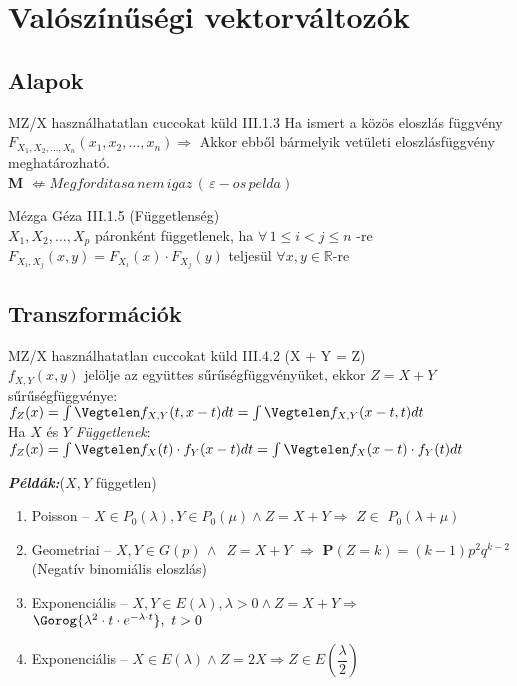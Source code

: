 \section{Valószínűségi vektorváltozók}

\subsection{Alapok}
  \begin{tetel}{MZ/X használhatatlan cuccokat küld}
	III.1.3 Ha ismert a közös eloszlás függvény $F_{X_1,X_2,\ldots,X_n}(x_1,x_2,\ldots,x_n) \Longrightarrow $ Akkor ebből bármelyik vetületi eloszlásfüggvény meghatározható. \\[3pt]
\small \textbf{M} $\nLeftarrow Megforditasa\, nem\, igaz\, (\, \varepsilon -os\, pelda)$
\normalsize \\[6pt]
\end{tetel}

  \begin{definicio}{Mézga Géza}
	III.1.5 (Függetlenség)\\[3pt]
	$X_1,X_2,\ldots,X_p$ páronként függetlenek, ha $\forall\, 1 \leq i < j \leq n$ -re $F_{X_i,X_j}(x,y) = F_{X_i}(x) \cdot F_{X_j}(y)$ teljesül $\forall x,y \in \mathbb{R} $-re
\end{definicio}

\subsection{Transzformációk}

  \begin{tetel}{MZ/X használhatatlan cuccokat küld}
	III.4.2 (X + Y = Z)\\[3pt]
	$f_{X,Y}(x,y)$ jelölje az együttes sűrűségfüggvényüket, ekkor $Z = X + Y$ sűrűségfüggvénye:\\[2pt]
\forceindent	$f_Z(x) = \int\Vegtelen f_{X,Y}(t,x-t) dt = \int\Vegtelen f_{X,Y}(x-t,t) dt$\\[2pt]
Ha $X$ és $Y$ \textit{Függetlenek}: \\[2pt]
\forceindent 	$f_Z(x) = \int\Vegtelen f_X(t) \cdot f_Y(x-t) dt = \int\Vegtelen f_X(x-t) \cdot f_Y(t) dt$\\[6pt]
\end{tetel}

\textbf{\textit{Példák:}}($X,Y$ független)
	\begin{enumerate}
 		\item Poisson --  $X \in P_0(\lambda), Y \in P_0(\mu) \land Z = X + Y \Longrightarrow$  $Z \in$ $P_0(\lambda + \mu)$
 		\item Geometriai -- $X,Y \in G(p)\, \land$\, $ Z = X + Y$  $\Longrightarrow$ $\textbf{P}(Z = k) = (k-1) p^2 q^{k-2}$ (Negatív binomiális eloszlás)
 		\item Exponenciális -- $X,Y \in E(\lambda), \lambda > 0 \land Z = X + Y \Longrightarrow$ $ \Gorog{\lambda^2 \cdot t \cdot e^{-\lambda \cdot t} },\,\, t > 0$ %
 		\item Exponenciális -- $X \in E(\lambda) \land Z = 2X \Longrightarrow Z \in E(\dfrac{\lambda}{2}) $
	\end{enumerate}

